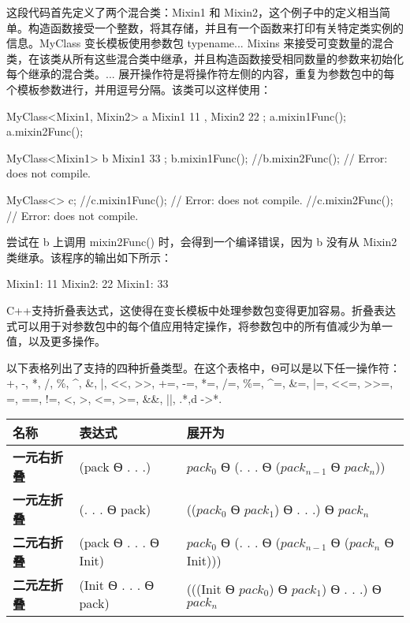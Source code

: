 这段代码首先定义了两个混合类：Mixin1 和 Mixin2，这个例子中的定义相当简单。构造函数接受一个整数，将其存储，并且有一个函数来打印有关特定类实例的信息。MyClass 变长模板使用参数包 typename... Mixins 来接受可变数量的混合类，在该类从所有这些混合类中继承，并且构造函数接受相同数量的参数来初始化每个继承的混合类。... 展开操作符是将操作符左侧的内容，重复为参数包中的每个模板参数进行，并用逗号分隔。该类可以这样使用：

\begin{cpp}
MyClass<Mixin1, Mixin2> a { Mixin1 { 11 }, Mixin2 { 22 } };
a.mixin1Func();
a.mixin2Func();

MyClass<Mixin1> b { Mixin1 { 33 } };
b.mixin1Func();
//b.mixin2Func(); // Error: does not compile.

MyClass<> c;
//c.mixin1Func(); // Error: does not compile.
//c.mixin2Func(); // Error: does not compile.
\end{cpp}

尝试在 b 上调用 mixin2Func() 时，会得到一个编译错误，因为 b 没有从 Mixin2 类继承。该程序的输出如下所示：

\begin{shell}
Mixin1: 11
Mixin2: 22
Mixin1: 33
\end{shell}


C++支持折叠表达式，这使得在变长模板中处理参数包变得更加容易。折叠表达式可以用于对参数包中的每个值应用特定操作，将参数包中的所有值减少为单一值，以及更多操作。

以下表格列出了支持的四种折叠类型。在这个表格中，Ѳ可以是以下任一操作符：+, -, *, /, \%, \^{}, \&, |, <{}<, >{}>, +=, -=, *=, /=, \%=, \^{}=, \&=, |=, <{}<=, >{}>=, =, ==, !=, <, >, <=, >=, \&\&, ||, .*,d ->*.

\begin{longtable}{|l|l|l|}
\hline
\textbf{名称}             & \textbf{表达式} & \textbf{展开为}             \\ \hline
\endfirsthead
%
\endhead
%
\textbf{一元右折叠} & (pack Ѳ . . .)      & $pack_0$ Ѳ (. . . Ѳ ($pack_{n-1}$ Ѳ $pack_n$)) \\ \hline
\textbf{一元左折叠}  & (. . . Ѳ pack)      & (($pack_0$ Ѳ $pack_1$) Ѳ . . .) Ѳ $pack_n$   \\ \hline
\textbf{二元右折叠} & (pack Ѳ . . . Ѳ Init) & $pack_0$ Ѳ (. . . Ѳ ($pack_{n-1}$ Ѳ ($pack_n$ Ѳ Init))) \\ \hline
\textbf{二元左折叠}  & (Init Ѳ . . . Ѳ pack) & (((Init Ѳ $pack_0$) Ѳ $pack_1$) Ѳ . . .) Ѳ $pack_n$   \\ \hline
\end{longtable}

